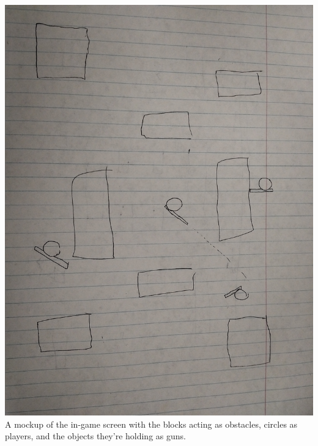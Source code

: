 \documentclass[11pt, oneside]{article}   	%
\begin{document}
\includegraphics[scale=.085]{mockup.jpg}\\
A mockup of the in-game screen with the blocks acting as obstacles, circles as players, and the objects they're holding as guns.
\end{document}
